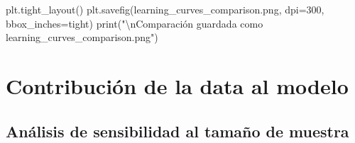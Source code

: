 \documentclass[
  doc,
  floatsintext,
  longtable,
  a4paper,
  nolmodern,
  notxfonts,
  notimes,
  12pt,
  colorlinks=true,linkcolor=blue,citecolor=blue,urlcolor=blue]{apa7}
\newenvironment{Shaded}{\begin{snugshade}}{\end{snugshade}}
\newcommand{\BuiltInTok}[1]{\textcolor[rgb]{0.00,0.23,0.31}{#1}}
\newcommand{\CharTok}[1]{\textcolor[rgb]{0.13,0.47,0.30}{#1}}
\newcommand{\DecValTok}[1]{\textcolor[rgb]{0.68,0.00,0.00}{#1}}
\newcommand{\NormalTok}[1]{\textcolor[rgb]{0.00,0.23,0.31}{#1}}
\newcommand{\OperatorTok}[1]{\textcolor[rgb]{0.37,0.37,0.37}{#1}}
\newcommand{\StringTok}[1]{\textcolor[rgb]{0.13,0.47,0.30}{#1}}
\begin{document}
\begin{Shaded}
\begin{Highlighting}[]
\NormalTok{plt.tight\_layout()}
\NormalTok{plt.savefig(}\StringTok{\textquotesingle{}learning\_curves\_comparison.png\textquotesingle{}}\NormalTok{, dpi}\OperatorTok{=}\DecValTok{300}\NormalTok{, bbox\_inches}\OperatorTok{=}\StringTok{\textquotesingle{}tight\textquotesingle{}}\NormalTok{)}
\BuiltInTok{print}\NormalTok{(}\StringTok{"}\CharTok{\textbackslash{}n}\StringTok{Comparación guardada como \textquotesingle{}learning\_curves\_comparison.png\textquotesingle{}"}\NormalTok{)}
\end{Highlighting}
\end{Shaded}

\section{Contribución de la data al
modelo}\label{contribuciuxf3n-de-la-data-al-modelo}

\subsection{Análisis de sensibilidad al tamaño de
muestra}\label{anuxe1lisis-de-sensibilidad-al-tamauxf1o-de-muestra}
\end{document}
